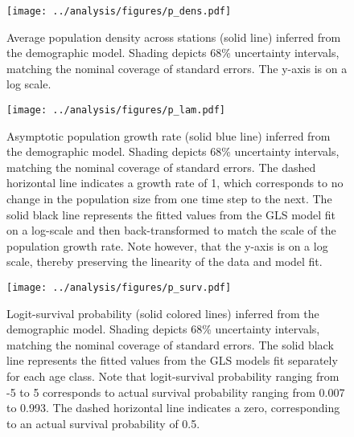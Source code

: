 \documentclass[11pt]{article}
\begin{document}
\clearpage
\begin{figure}
\centering
\texttt{[image: ../analysis/figures/p\_dens.pdf]}
\caption{\label{fig:p_dens}
Average population density across stations (solid line) 
inferred from the demographic model.
Shading depicts 68\% uncertainty intervals, 
matching the nominal coverage of standard errors.
The y-axis is on a log scale.
}
\end{figure}
\clearpage

\clearpage
\begin{figure}
\centering
\texttt{[image: ../analysis/figures/p\_lam.pdf]}
\caption{\label{fig:p_lam}
Asymptotic population growth rate (solid blue line) inferred from the demographic model.
Shading depicts 68\% uncertainty intervals, 
matching the nominal coverage of standard errors.
The dashed horizontal line indicates a growth rate of 1,
which corresponds to no change in the population size from one time step to the next.
The solid black line represents the fitted values from the GLS model
fit on a log-scale and then back-transformed 
to match the scale of the population growth rate.
Note however, that the y-axis is on a log scale, 
thereby preserving the linearity of the data and model fit.
}
\end{figure}
\clearpage

\clearpage
\begin{figure}
\centering
\texttt{[image: ../analysis/figures/p\_surv.pdf]}
\caption{\label{fig:p_surv}
Logit-survival probability (solid colored lines) inferred from the demographic model.
Shading depicts 68\% uncertainty intervals, 
matching the nominal coverage of standard errors.
The solid black line represents the fitted values from the GLS models
fit separately for each age class.
Note that logit-survival probability ranging from -5 to 5 
corresponds to actual survival probability ranging from 0.007 to 0.993.
The dashed horizontal line indicates a zero, corresponding to 
an actual survival probability of 0.5.
}
\end{figure}
\clearpage
\end{document}

